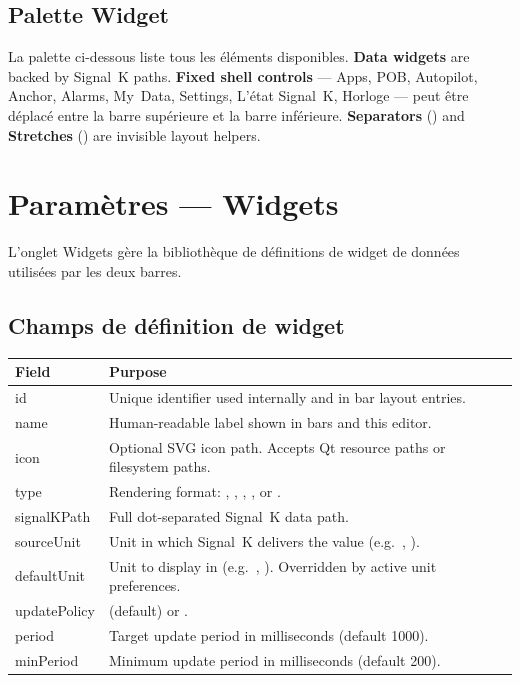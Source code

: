 \section{Palette Widget}

La palette ci-dessous liste tous les éléments disponibles.
\textbf{Data widgets} are backed by Signal~K paths.
\textbf{Fixed shell controls} --- Apps, POB, Autopilot, Anchor, Alarms, My~Data, Settings,
L'état Signal~K, Horloge --- peut être déplacé entre la barre supérieure et la barre inférieure.
\textbf{Separators} () and \textbf{Stretches}
() are invisible layout helpers.

\chapter{Paramètres --- Widgets}
\label{ch:settings-widgets}

L'onglet Widgets gère la bibliothèque de définitions de widget de données utilisées par les deux barres.


\section{Champs de définition de widget}

\begin{longtable}{L{2.8cm}L{10.9cm}}
\toprule
{}
\color{white}\sffamily\bfseries Field &
\color{white}\sffamily\bfseries Purpose \\
\midrule
id            & Unique identifier used internally and in bar layout entries. \\
name          & Human-readable label shown in bars and this editor. \\
icon          & Optional SVG icon path. Accepts Qt resource paths or filesystem paths. \\
type          & Rendering format: , , ,
                , or . \\
signalKPath   & Full dot-separated Signal~K data path. \\
sourceUnit    & Unit in which Signal~K delivers the value (e.g.\ , ). \\
defaultUnit   & Unit to display in (e.g.\ , ).
                Overridden by active unit preferences. \\
updatePolicy  &  (default) or . \\
period        & Target update period in milliseconds (default 1000). \\
minPeriod     & Minimum update period in milliseconds (default 200). \\
\bottomrule
\end{longtable}

